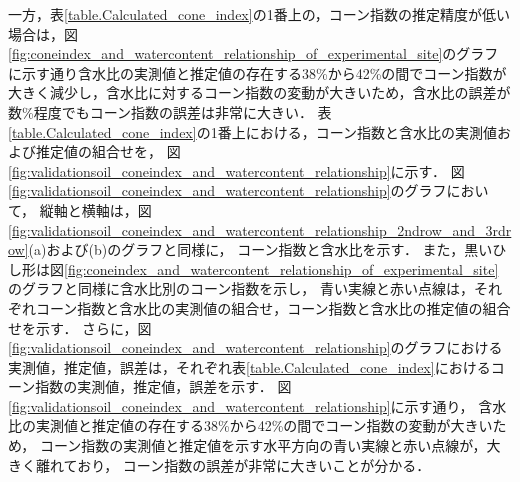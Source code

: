 一方，表\ref{table.Calculated_cone_index}の1番上の，コーン指数の推定精度が低い場合は，図\ref{fig:coneindex_and_watercontent_relationship_of_experimental_site}のグラフに示す通り含水比の実測値と推定値の存在する38\%から42\%の間でコーン指数が大きく減少し，含水比に対するコーン指数の変動が大きいため，含水比の誤差が数\%程度でもコーン指数の誤差は非常に大きい．
表\ref{table.Calculated_cone_index}の1番上における，コーン指数と含水比の実測値および推定値の組合せを，
図\ref{fig:validationsoil_coneindex_and_watercontent_relationship}に示す．
図\ref{fig:validationsoil_coneindex_and_watercontent_relationship}のグラフにおいて，
縦軸と横軸は，図\ref{fig:validationsoil_coneindex_and_watercontent_relationship_2ndrow_and_3rdrow}(a)および(b)のグラフと同様に，
コーン指数と含水比を示す．
また，黒いひし形は図\ref{fig:coneindex_and_watercontent_relationship_of_experimental_site}のグラフと同様に含水比別のコーン指数を示し，
青い実線と赤い点線は，それぞれコーン指数と含水比の実測値の組合せ，コーン指数と含水比の推定値の組合せを示す．
さらに，図\ref{fig:validationsoil_coneindex_and_watercontent_relationship}のグラフにおける実測値，推定値，誤差は，それぞれ表\ref{table.Calculated_cone_index}におけるコーン指数の実測値，推定値，誤差を示す．
図\ref{fig:validationsoil_coneindex_and_watercontent_relationship}に示す通り，
含水比の実測値と推定値の存在する38\%から42\%の間でコーン指数の変動が大きいため，
コーン指数の実測値と推定値を示す水平方向の青い実線と赤い点線が，大きく離れており，
コーン指数の誤差が非常に大きいことが分かる．



